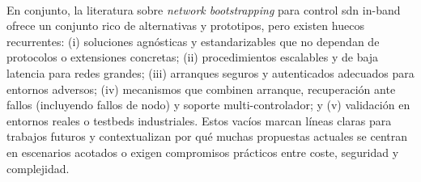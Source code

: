 \\
En conjunto, la literatura sobre \textit{network bootstrapping} para control \gls{sdn} in-band ofrece un conjunto rico de alternativas y prototipos, pero existen huecos recurrentes: (i) soluciones agnósticas y estandarizables que no dependan de protocolos o extensiones concretas; (ii) procedimientos escalables y de baja latencia para redes grandes; (iii) arranques seguros y autenticados adecuados para entornos adversos; (iv) mecanismos que combinen arranque, recuperación ante fallos (incluyendo fallos de nodo) y soporte multi-controlador; y (v) validación en entornos reales o testbeds industriales. Estos vacíos marcan líneas claras para trabajos futuros y contextualizan por qué muchas propuestas actuales se centran en escenarios acotados o exigen compromisos prácticos entre coste, seguridad y complejidad.\\
\\
